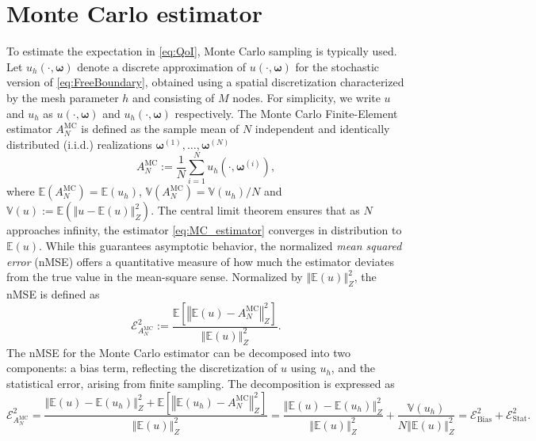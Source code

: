 \documentclass[final,3p,times,11pt]{elsarticle}
\begin{document}
\section{Monte Carlo estimator}\label{sec:MC}
To estimate the expectation in \eqref{eq:QoI}, Monte Carlo sampling is typically used.  Let $u_h (\cdot, \boldsymbol{\omega})$ denote a discrete approximation of $u(\cdot, \boldsymbol{\omega})$ for the stochastic version of \eqref{eq:FreeBoundary}, obtained using a spatial discretization characterized by the mesh parameter $h$ and consisting of $M$ nodes. For simplicity, we write $u$ and $u_h$ as $u(\cdot,\boldsymbol \omega)$ and $u_h(\cdot,\boldsymbol \omega)$ respectively. The Monte Carlo Finite-Element estimator $A^{\text{MC}}_{N}$ is defined as the sample mean of $N$ independent and identically distributed (i.i.d.) realizations $\boldsymbol{\omega}^{(1)},\ldots,\boldsymbol{\omega}^{(N)}$
%
\begin{equation}\label{eq:MC_estimator}
    A^{\text{MC}}_{N} := \frac{1}{N}\sum_{i=1}^{N} u_{h}(\cdot, \boldsymbol{\omega}^{(i)}),
\end{equation}
%
where $\mathbb{E}(A^{\text{MC}}_{N}) = \mathbb{E}(u_{h})$, $\mathbb{V}(A^{\text{MC}}_{N}) = \mathbb{V}( u_{h})/{N}$ and $\mathbb{V}(u) := \mathbb{E}\left(\left\Vert u - \mathbb{E}(u)\right\Vert_Z^2\right)$. The central limit theorem ensures that as $N$ approaches infinity, the estimator \eqref{eq:MC_estimator} converges in distribution to $\mathbb{E}(u)$. While this guarantees asymptotic behavior, the normalized \textit{mean squared error} (nMSE) offers a quantitative measure of how much the estimator deviates from the true value in the mean-square sense. Normalized by $\left\Vert\mathbb{E}(u) \right\Vert_{Z}^2$, the nMSE is defined as
%
 \[
\mathcal{E}_{A^{\text{MC}}_{N}}^2:=\frac{\mathbb E\left[\left\Vert\mathbb{E}(u)-A^{\text{MC}}_{N} \right\Vert_{Z}^2\right]}{\left\Vert\mathbb{E}(u) \right\Vert_{Z}^2}.
\] 
%
The nMSE for the Monte Carlo estimator can be decomposed into two components: a bias term, reflecting the discretization of $u$ using $u_h$, and the statistical error, arising from finite sampling. The decomposition is expressed as
%
\[
\mathcal{E}_{A^{\text{MC}}_{N}}^2 = \frac{\left\Vert\mathbb{E}(u)-\mathbb{E}(u_{h}) \right\Vert_{Z}^2+\mathbb E\left[\left\Vert \mathbb{E}(u_{h}) -A^{\text{MC}}_{N} \right\Vert_{Z}^2\right]}{\left\Vert\mathbb{E}(u) \right\Vert_{Z}^2} = \frac{\left\Vert\mathbb{E}(u)-\mathbb{E}(u_{h}) \right\Vert_{Z}^2}{\left\Vert\mathbb{E}(u) \right\Vert_{Z}^2}+\frac{\mathbb{V}\left( u_{h}\right)}{N\left\Vert\mathbb{E}(u) \right\Vert_{Z}^2}=\mathcal{E}_{\text{Bias}}^2 + \mathcal{E}_{\text{Stat}}^2.
\]
\end{document}

